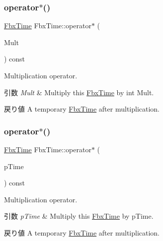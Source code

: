 \subsubsection{\texorpdfstring{operator$\ast$()}{operator*()}\hspace{0.1cm}{\footnotesize\ttfamily [1/2]}}
{\footnotesize\ttfamily \hyperlink{class_fbx_time}{Fbx\+Time} Fbx\+Time\+::operator$\ast$ (\begin{DoxyParamCaption}\item[{const int}]{Mult }\end{DoxyParamCaption}) const}

Multiplication operator. 
\begin{DoxyParams}{引数}
{\em Mult} & Multiply this \hyperlink{class_fbx_time}{Fbx\+Time} by int Mult. \\
\hline
\end{DoxyParams}
\begin{DoxyReturn}{戻り値}
A temporary \hyperlink{class_fbx_time}{Fbx\+Time} after multiplication. 
\end{DoxyReturn}
\mbox{\label{class_fbx_time_a43c5cf2a3f56dd7d2aab96b45a5473b7}} 
\subsubsection{\texorpdfstring{operator$\ast$()}{operator*()}\hspace{0.1cm}{\footnotesize\ttfamily [2/2]}}
{\footnotesize\ttfamily \hyperlink{class_fbx_time}{Fbx\+Time} Fbx\+Time\+::operator$\ast$ (\begin{DoxyParamCaption}\item[{const \hyperlink{class_fbx_time}{Fbx\+Time} \&}]{p\+Time }\end{DoxyParamCaption}) const}

Multiplication operator. 
\begin{DoxyParams}{引数}
{\em p\+Time} & Multiply this \hyperlink{class_fbx_time}{Fbx\+Time} by p\+Time. \\
\hline
\end{DoxyParams}
\begin{DoxyReturn}{戻り値}
A temporary \hyperlink{class_fbx_time}{Fbx\+Time} after multiplication. 
\end{DoxyReturn}
\mbox{\label{class_fbx_time_a42823b945fc1ccbd550df5a2b1768ca9}} 
